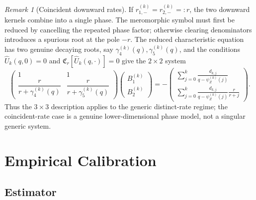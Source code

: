 \documentclass[11pt]{article}
\theoremstyle{plain}
\theoremstyle{definition}
\theoremstyle{remark}
\newtheorem{remark}{Remark}
\begin{document}
\begin{remark}[Coincident downward rates]\label{rem:coincident-rates}
If $r_{1,-}^{(k)}=r_{2,-}^{(k)}=:r$, the two downward kernels combine into a single phase.
The meromorphic symbol must first be reduced by cancelling the repeated phase factor;
otherwise clearing denominators introduces a spurious root at the pole $-r$. The reduced
characteristic equation has two genuine decaying roots, say
$\gamma_4^{(k)}(q),\gamma_5^{(k)}(q)$, and the
conditions $\widehat U_k(q,0)=0$ and
$\mathfrak C_r[\widehat U_k(q,\cdot)]=0$ give the $2\times2$ system
\[
\begin{pmatrix}
1&1\\[4pt]
\dfrac{r}{r+\gamma_4^{(k)}(q)}&\dfrac{r}{r+\gamma_5^{(k)}(q)}
\end{pmatrix}
\begin{pmatrix}B_1^{(k)}\\B_2^{(k)}\end{pmatrix}
=-
\begin{pmatrix}
\displaystyle\sum_{j=0}^{k}\frac{d_{k,j}}{q-\psi_Z^{(k)}(j)}\\[10pt]
\displaystyle\sum_{j=0}^{k}\frac{d_{k,j}}{q-\psi_Z^{(k)}(j)}\frac{r}{r+j}
\end{pmatrix}.
\]
Thus the $3\times3$ description applies to the generic distinct-rate regime; the
coincident-rate case is a genuine lower-dimensional phase model, not a singular generic
system.
\end{remark}

\clearpage

\section{Empirical Calibration}\label{sec:calibration}

\subsection{Estimator}\label{sec:ecf-estimator}
\end{document}
